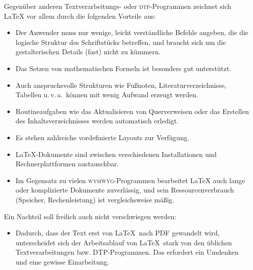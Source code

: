 Gegenüber anderen Textverarbeitungs- oder \textsc{dtp}-Programmen 
zeichnet sich \LaTeX{}
vor allem durch die folgenden Vorteile aus:
\begin{itemize}
\item Der Anwender muss nur wenige, leicht verständliche Befehle
  angeben, die die logische Struktur des Schriftstücks
  betreffen, und braucht sich um die gestalterischen Details
  (fast) nicht zu kümmern.
\item Das Setzen von mathematischen Formeln ist besonders gut
  unterstützt.
\item Auch anspruchsvolle Strukturen wie Fußnoten, Literaturverzeichnisse,
  Tabellen u.\,v.\,a.\  können mit wenig Aufwand erzeugt werden.
\item Routineaufgaben wie das Aktualisieren von Querverweisen
 oder das Erstellen des Inhaltsverzeichnisses 
 werden automatisch erledigt.
\item Es stehen zahlreiche vordefinierte Layouts zur Verfügung.
\item \LaTeX-Dokumente sind zwischen verschiedenen Installationen und
 Rechnerplattformen austauschbar.
\item Im Gegensatz zu vielen \textsc{wysiwyg}-Programmen bearbeitet \LaTeX{} auch
  lange oder komplizierte Dokumente zuverlässig,
  und sein Ressourcenverbrauch (Speicher, Rechenleistung) ist vergleichsweise
  mäßig.
\end{itemize}
Ein Nachteil soll freilich auch nicht verschwiegen werden:
\begin{itemize}
\item Dadurch, dass der Text erst von \LaTeX\ nach PDF gewandelt wird, unterscheidet sich der Arbeitsablauf von \LaTeX\ stark von den üblichen Textverarbeitungen bzw. DTP-Programmen. Das erfordert ein Umdenken und eine gewisse Einarbeitung.
\end{itemize}

